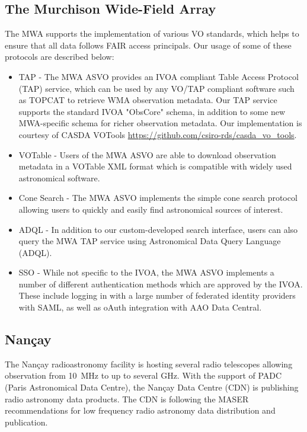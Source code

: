 \documentclass[11pt,a4paper]{ivoatex/ivoa}
\begin{document}
\subsection{The Murchison Wide-Field Array}
\label{sec:MWA}
The MWA supports the implementation of various VO standards, which helps to ensure that all data follows 
FAIR access principals. Our usage of some of these protocols are described below:
\begin{itemize}
\item TAP - The MWA ASVO provides an IVOA compliant Table Access Protocol (TAP) service, which can be 
used by any VO/TAP compliant software such as TOPCAT to retrieve WMA observation metadata. Our TAP 
service supports the standard IVOA "ObsCore" schema, in addition to some new MWA-specific schema for 
richer observation metadata. Our implementation is courtesy of CASDA VOTools 
\url{https://github.com/csiro-rds/casda_vo_tools}.
\item VOTable - Users of the MWA ASVO are able to download observation metadata in a VOTable XML format 
which is compatible with widely used astronomical software.
\item Cone Search - The MWA ASVO implements the simple cone search protocol allowing users to quickly
and easily find astronomical sources of interest.
\item ADQL - In addition to our custom-developed search interface, users can also query the MWA TAP
service using Astronomical Data Query Language (ADQL).
\item SSO - While not specific to the IVOA, the MWA ASVO implements a number of different authentication 
methods which are approved by the IVOA. These include logging in with a large number of federated 
identity providers with SAML, as well as oAuth integration with AAO Data Central.
\end{itemize}


\subsection{Nan\c cay}
\label{sec:Nancay}

The Nan\c cay radioastronomy facility is hosting several radio telescopes allowing observation from 
10~MHz to up to several GHz. With the support of PADC (Paris Astronomical Data Centre), the Nan\c cay 
Data Centre (CDN) is publishing radio astronomy data products. The CDN is following the MASER \cite{10.5334/dsj-2020-012}
recommendations for low frequency radio astronomy data distribution and publication. 
\end{document}
